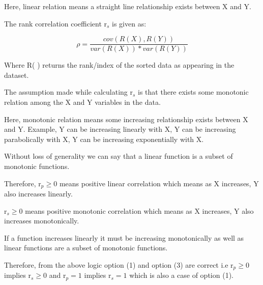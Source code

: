\documentclass[12pt]{article}
\begin{document}
\noindent Here, linear relation means a straight line relationship exists between X and Y.

\noindent The rank correlation coefficient r$_s$ is given as:

$$
\rho = \dfrac{cov(R(X),R(Y))}{var(R(X)) * var(R(Y))}
$$

\vspace{3mm}

\noindent Where R( ) returns the rank/index of the sorted data as appearing in the dataset. 

\noindent The assumption made while calculating r$_s$ is that there exists some monotonic relation among the X and Y variables in the data.

\vspace{3mm}

\noindent Here, monotonic relation means some increasing relationship exists between X and Y. Example, Y can be increasing linearly with X, Y can be increasing parabolically with X, Y can be increasing exponentially with X.

\vspace{3mm}

\noindent Without loss of generality we can say that a linear function is a subset of monotonic functions.

\vspace{3mm}

\noindent Therefore, r$_p \geqslant 0$ means positive linear correlation which means as X increases, Y also increases linearly.

\vspace{3mm}

\noindent r$_s \geqslant 0$ means positive monotonic correlation which means as X increases, Y also increases monotonically.

\noindent If a function increases linearly it must be increasing monotonically as well as linear functions are a subset of monotonic functions.

\vspace{3mm}

\noindent Therefore, from the above logic option (1) and option (3) are correct i.e r$_p \geqslant 0$ implies r$_s \geqslant 0$ and r$_p = 1$ implies r$_s = 1$ which is also a case of option (1).

\vspace{3mm}
\end{document}

